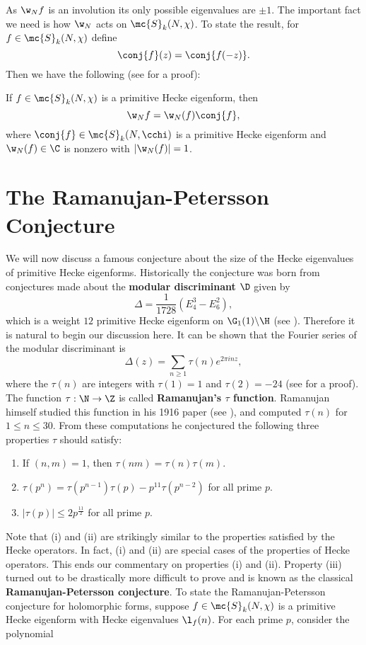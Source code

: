     As $\w_{N}f$ is an involution its only possible eigenvalues are $\pm 1$. The important fact we need is how $\w_{N}$ acts on $\mc{S}_{k}(N,\chi)$. To state the result, for $f \in \mc{S}_{k}(N,\chi)$ define
    \[
      \conj{f}(z) = \conj{f(-z)}.
    \]
    Then we have the following (see \cite{cohenmodular2017} for a proof):

    \begin{proposition}\label{prop:Atkin_Lehner_conjugation_holomorphic}
      If $f \in \mc{S}_{k}(N,\chi)$ is a primitive Hecke eigenform, then
      \[
        \w_{N}f = \w_{N}(f)\conj{f},
      \]
      where $\conj{f} \in \mc{S}_{k}(N,\cchi)$ is a primitive Hecke eigenform and $\w_{N}(f) \in \C$ is nonzero with $|\w_{N}(f)| = 1$.
    \end{proposition}
  \section{The Ramanujan-Petersson Conjecture}
    We will now discuss a famous conjecture about the size of the Hecke eigenvalues of primitive Hecke eigenforms. Historically the conjecture was born from conjectures made about the \textbf{modular discriminant} $\D$ given by
    \[
      \Delta = \frac{1}{1728}(E_{4}^{3}-E_{6}^{2}),
    \]
    which is a weight $12$ primitive Hecke eigenform on $\G_{1}(1)\backslash\H$ (see \cite{diamond2005first}). Therefore it is natural to begin our discussion here. It can be shown that the Fourier series of the modular discriminant is
    \[
      \Delta(z) = \sum_{n \ge 1}\tau(n)e^{2\pi i nz},
    \]
    where the $\tau(n)$ are integers with $\tau(1) = 1$ and $\tau(2) = -24$ (see \cite{apostol1976introduction} for a proof). The function $\tau:\N \to \Z$ is called \textbf{Ramanujan's $\tau$ function}. Ramanujan himself studied this function in his 1916 paper (see \cite{ramanujan1916certain}), and computed $\tau(n)$ for $1 \le n \le 30$. From these computations he conjectured the following three properties $\tau$ should satisfy:
    \begin{enumerate}[label=(\roman*)]
      \item If $(n,m) = 1$, then $\tau(nm) = \tau(n)\tau(m)$.
      \item $\tau(p^{n}) = \tau(p^{n-1})\tau(p)-p^{11}\tau(p^{n-2})$ for all prime $p$.
      \item $|\tau(p)| \le 2p^{\frac{11}{2}}$ for all prime $p$.
    \end{enumerate}
    Note that (i) and (ii) are strikingly similar to the properties satisfied by the Hecke operators. In fact, (i) and (ii) are special cases of the properties of Hecke operators. This ends our commentary on properties (i) and (ii). Property (iii) turned out to be drastically more difficult to prove and is known as the classical \textbf{Ramanujan-Petersson conjecture}. To state the Ramanujan-Petersson conjecture for holomorphic forms, suppose $f \in \mc{S}_{k}(N,\chi)$ is a primitive Hecke eigenform with Hecke eigenvalues $\l_{f}(n)$. For each prime $p$, consider the polynomial
